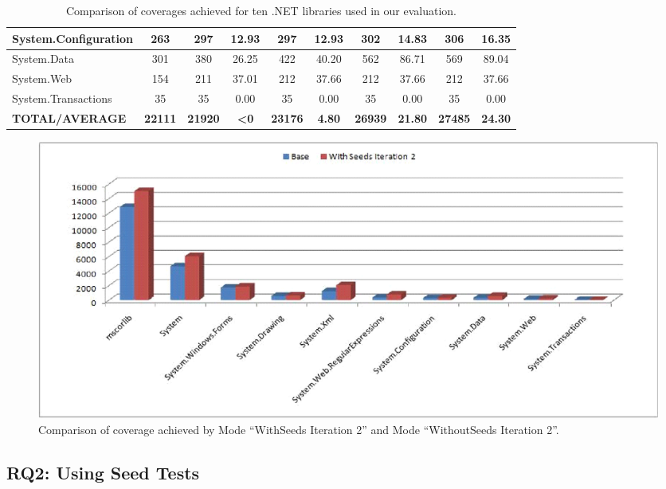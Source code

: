 \begin{table}[t]
\begin{SmallOut}
\begin{CodeOut}
\begin{center}
\begin {tabular} {|l|c|c|c|c|c|c|c|c|c|}
\hline  System.Configuration 	& 263 		& 297 	& 12.93		& 297		& 12.93	& 302		& 14.83		& 306		& 16.35 				\\
\hline  System.Data 					& 301 		& 380		& 26.25		& 422		& 40.20	& 562		& 86.71		& 569		& 89.04 				\\
\hline  System.Web 						& 154			& 211		& 37.01		& 212		& 37.66	& 212		& 37.66		& 212		& 37.66 				\\
\hline  System.Transactions 	& 35			& 35		& 0.00		& 35		& 0.00	& 35		& 0.00		& 35		& 0.00 					\\
\hline \textbf{TOTAL/AVERAGE} & \textbf{22111} & \textbf{21920} & \textbf{<0} & \textbf{23176} & \textbf{4.80} & \textbf{26939}	& \textbf{21.80} & \textbf{27485} & \textbf{24.30} \\
\hline
\end{tabular}
\end{center}
\end{CodeOut}
\end{SmallOut}
\centering \caption {\label{tab:detailedres}Comparison of coverages achieved for ten .NET libraries used in our evaluation.}
\end{table}

\begin{figure}[t]
\centering
\includegraphics[scale=0.70,clip]{figs/RQ2_1.eps}\vspace*{-1ex}
\caption{\label{fig:rq2}Comparison of coverage achieved by Mode ``WithSeeds Iteration 2'' and Mode ``WithoutSeeds Iteration 2''.} 
\end{figure}

\subsection{RQ2: Using Seed Tests}

